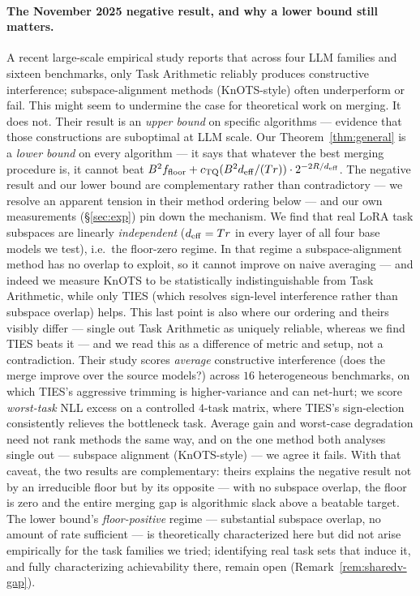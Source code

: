 \paragraph{The November 2025 negative result, and why a lower
bound still matters.} A recent large-scale empirical study
\cite{systematic2025merging} reports that across four LLM
families and sixteen benchmarks, only Task Arithmetic reliably
produces constructive interference; subspace-alignment methods
(KnOTS-style) often underperform or fail. This might seem to
undermine the case for theoretical work on merging. It does not.
Their result is an \emph{upper bound} on specific algorithms —
evidence that those constructions are suboptimal at LLM scale.
Our Theorem~\ref{thm:general} is a \emph{lower bound} on every
algorithm — it says that whatever the best merging procedure is,
it cannot beat $B^2 f_{\mathrm{floor}} + c_{\mathrm{TQ}}
(B^2 d_{\mathrm{eff}} / (Tr)) \cdot 2^{-2R/d_{\mathrm{eff}}}$. The negative result and
our lower bound are complementary rather than contradictory --- we
resolve an apparent tension in their method ordering below --- and our
own measurements (\S\ref{sec:exp}) pin down the mechanism. We
find that real LoRA task subspaces are linearly
\emph{independent} ($d_{\mathrm{eff}} = Tr$ in every layer of all four base
models we test), i.e.\ the floor-zero regime. In that regime a
subspace-alignment method has no overlap to exploit, so it cannot
improve on naive averaging — and indeed we measure KnOTS to be
statistically indistinguishable from Task Arithmetic, while only
TIES (which resolves sign-level interference rather than subspace
overlap) helps. This last point is also where our ordering and theirs
visibly differ --- \cite{systematic2025merging} single out Task
Arithmetic as uniquely reliable, whereas we find TIES beats it --- and
we read this as a difference of metric and setup, not a contradiction.
Their study scores \emph{average} constructive interference (does the
merge improve over the source models?) across $16$ heterogeneous
benchmarks, on which TIES's aggressive trimming is higher-variance and
can net-hurt; we score \emph{worst-task} NLL excess on a controlled
$4$-task matrix, where TIES's sign-election consistently relieves the
bottleneck task. Average gain and worst-case degradation need not rank
methods the same way, and on the one method both analyses single out
--- subspace alignment (KnOTS-style) --- we agree it fails. With that
caveat, the two results are complementary: theirs explains the
\cite{systematic2025merging} negative result not by an
irreducible floor but by its opposite --- with no subspace overlap,
the floor is zero and the entire merging gap is algorithmic
slack above a beatable target. The lower bound's
\emph{floor-positive} regime — substantial subspace overlap, no
amount of rate sufficient — is theoretically characterized here
but did not arise empirically for the task families we tried;
identifying real task sets that induce it, and fully
characterizing achievability there, remain open
(Remark~\ref{rem:sharedv-gap}).
